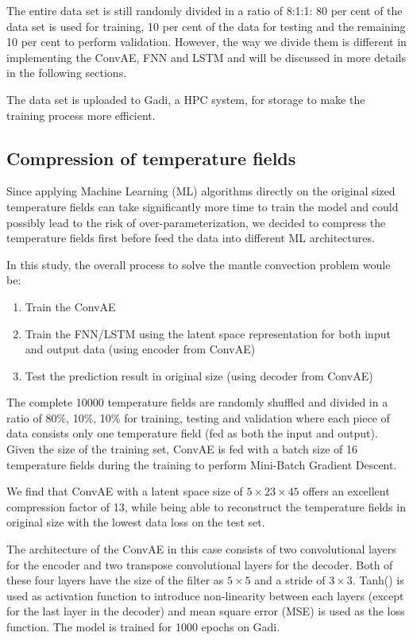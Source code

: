 The entire data set is still randomly divided in a ratio of 8:1:1: 80 per cent of the data set is used for training, 10 per cent of the data for testing and the remaining 10 per cent to perform validation. However, the way we divide them is different in implementing the ConvAE, FNN and LSTM and will be discussed in more details in the following sections.

The data set is uploaded to Gadi, a HPC system, for storage to make the training process more efficient. 

\subsection{Compression of temperature fields}

Since applying Machine Learning (ML) algorithms directly on the original sized temperature fields can take significantly more time to train the model and could possibly lead to the risk of over-parameterization, we decided to compress the temperature fields first before feed the data into different ML architectures.

In this study, the overall process to solve the mantle convection problem woule be: 

\begin{enumerate}
  \item Train the ConvAE
  \item Train the FNN/LSTM using the latent space representation for both input and output data (using encoder from ConvAE)
  \item Test the prediction result in original size (using decoder from ConvAE)
\end{enumerate}

The complete 10000 temperature fields are randomly shuffled and divided in a ratio of 80\%, 10\%, 10\% for training, testing and validation where each piece of data consists only one temperature field (fed as both the input and output). Given the size of the training set, ConvAE is fed with a batch size of 16 temperature fields during the training to perform Mini-Batch Gradient Descent.

We find that ConvAE with a latent space size of $5 \times 23 \times 45$ offers an excellent compression factor of 13, while being able to reconstruct the temperature fields in original size with the lowest data loss on the test set.

The architecture of the ConvAE in this case consists of two convolutional layers for the encoder and two transpose convolutional layers for the decoder. Both of these four layers have the size of the filter as $5 \times 5$ and a stride of $3 \times 3$. Tanh() is used as activation function to introduce non-linearity between each layers (except for the last layer in the decoder) and mean square error (MSE) is used as the loss function. The model is trained for 1000 epochs on Gadi.


